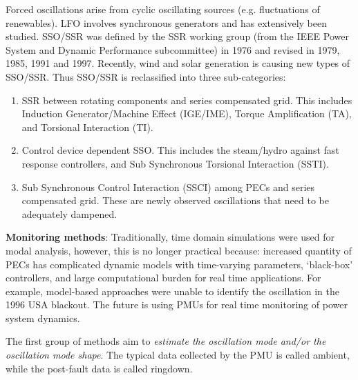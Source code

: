 \documentclass[12pt, a4paper]{report}
\begin{document}
Forced oscillations arise from cyclic oscillating sources (e.g. fluctuations of renewables). LFO involves synchronous generators and has extensively been studied. SSO/SSR was defined by the SSR working group (from the IEEE Power System and Dynamic Performance subcommittee) in 1976 and revised in 1979, 1985, 1991 and 1997. Recently, wind and solar generation is causing new types of SSO/SSR. Thus SSO/SSR is reclassified into three sub-categories:
\begin{enumerate}
	\item SSR between rotating components and series compensated grid. This includes  Induction Generator/Machine Effect (IGE/IME), Torque Amplification (TA), and Torsional Interaction (TI).
	\item Control device dependent SSO. This includes the steam/hydro against fast response controllers, and Sub Synchronous Torsional Interaction (SSTI).
	\item Sub Synchronous Control Interaction (SSCI) among PECs and series compensated grid. These are newly observed oscillations that need to be adequately dampened. 
\end{enumerate}
\textbf{Monitoring methods}: Traditionally, time domain simulations were used for modal analysis, however, this is no longer practical because: increased quantity of PECs has complicated dynamic models with time-varying parameters, `black-box' controllers, and large computational burden for real time applications. For example, model-based approaches were unable to identify the oscillation in the 1996 USA blackout. The future is using PMUs for real time monitoring of power system dynamics.\par
The first group of methods aim to \emph{estimate the oscillation mode and/or the oscillation mode shape}. The typical data collected by the PMU is called ambient, while the post-fault data is called ringdown.
\end{document}
